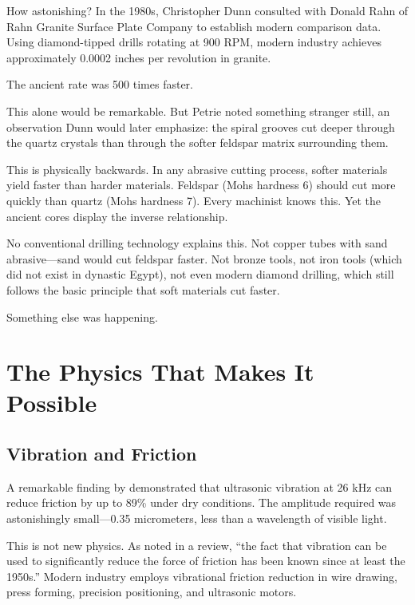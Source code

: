\documentclass[11pt]{article}
\begin{document}
How astonishing? In the 1980s, Christopher Dunn consulted with Donald Rahn of Rahn Granite Surface Plate Company to establish modern comparison data. Using diamond-tipped drills rotating at 900 RPM, modern industry achieves approximately 0.0002 inches per revolution in granite.

The ancient rate was 500 times faster.

This alone would be remarkable. But Petrie noted something stranger still, an observation Dunn would later emphasize: the spiral grooves cut deeper through the quartz crystals than through the softer feldspar matrix surrounding them.

This is physically backwards. In any abrasive cutting process, softer materials yield faster than harder materials. Feldspar (Mohs hardness 6) should cut more quickly than quartz (Mohs hardness 7). Every machinist knows this. Yet the ancient cores display the inverse relationship.

No conventional drilling technology explains this. Not copper tubes with sand abrasive---sand would cut feldspar faster. Not bronze tools, not iron tools (which did not exist in dynastic Egypt), not even modern diamond drilling, which still follows the basic principle that soft materials cut faster.

Something else was happening.

\section{The Physics That Makes It Possible}

\subsection{Vibration and Friction}

A remarkable finding by \citet{Luo2024} demonstrated that ultrasonic vibration at 26 kHz can reduce friction by up to 89\% under dry conditions. The amplitude required was astonishingly small---0.35 micrometers, less than a wavelength of visible light.

This is not new physics. As \citet{Popov2020} noted in a review, ``the fact that vibration can be used to significantly reduce the force of friction has been known since at least the 1950s.'' Modern industry employs vibrational friction reduction in wire drawing, press forming, precision positioning, and ultrasonic motors.
\end{document}
